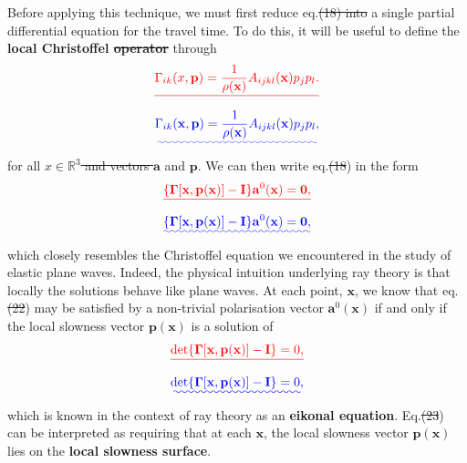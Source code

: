 \documentclass [a4paper,12pt]{paper}
\providecommand{\DIFadd}[1]{{\protect\color{blue}\uwave{#1}}} %
\providecommand{\DIFdel}[1]{{\protect\color{red}\sout{#1}}}                      %
\providecommand{\DIFaddbegin}{} %
\providecommand{\DIFaddend}{} %
\providecommand{\DIFdelbegin}{} %
\providecommand{\DIFdelend}{} %
\begin{document}
Before applying this technique, we must first reduce eq.\DIFdelbegin \DIFdel{(18) into }\DIFdelend \DIFaddbegin \DIFadd{~(\ref{eq:18}) to }\DIFaddend a single partial differential equation for the travel time. 
To do this, it will be useful to define the \textbf{local Christoffel \DIFdelbegin \DIFdel{operator}\DIFdelend \DIFaddbegin \DIFadd{matrix}\DIFaddend } through
\DIFdelbegin \begin{displaymath}
\DIFdel{\Gamma_{ik}(x,\mathbf{p})=\frac{1}{\rho(\mathbf{x})}A_{ijkl}(\mathbf{x})p_{j}p_{l}.
}\end{displaymath}%
\DIFdelend \DIFaddbegin \begin{equation}
\DIFadd{\Gamma_{ik}(\mathbf{x},\mathbf{p})=\frac{1}{\rho(\mathbf{x})}A_{ijkl}(\mathbf{x})p_{j}p_{l},
\label{eq:21}
}\end{equation}\DIFaddend 
for all \DIFdelbegin \DIFdel{$x\in\mathbb{R}^{3}$ and vectors $\mathbf{a}$ }\DIFdelend \DIFaddbegin \DIFadd{$\mathbf{x}\in\mathbb{R}^{3}$ }\DIFaddend and $\mathbf{p}$. We can then write eq.\DIFdelbegin \DIFdel{(18}\DIFdelend \DIFaddbegin \DIFadd{~(\ref{eq:18}}\DIFaddend ) in the form
\DIFdelbegin \begin{displaymath}
\DIFdel{\{\bm{\Gamma}[\mathbf{x},\mathbf{p}(\mathbf{x})]-\mathbf{I}\}\mathbf{a}^{0}(\mathbf{x})=\mathbf{0},
}\end{displaymath}%
\DIFdelend \DIFaddbegin \begin{equation}
\DIFadd{\{\bm{\Gamma}[\mathbf{x},\mathbf{p}(\mathbf{x})]-\mathbf{I}\}\mathbf{a}^{0}(\mathbf{x})=\mathbf{0},
\label{eq:22}
}\end{equation}\DIFaddend 
which closely resembles the Christoffel equation we encountered in the study of elastic plane waves. Indeed, 
the physical intuition underlying ray theory is that locally the solutions behave like plane waves.
 At each point, $\mathbf{x}$, we know that eq.\DIFdelbegin \DIFdel{(22}\DIFdelend \DIFaddbegin \DIFadd{~(\ref{eq:22}}\DIFaddend ) may be satisfied by a non-trivial polarisation vector 
 $\mathbf{a}^{0}(\mathbf{x})$ if and only if the local slowness vector $\mathbf{p}(\mathbf{x})$ is a solution of
\DIFdelbegin \begin{displaymath}
\DIFdel{\det\{\bm{\Gamma}[\mathbf{x},\mathbf{p}(\mathbf{x})]-\mathbf{I}\}=0,
}\end{displaymath}%
\DIFdelend \DIFaddbegin \begin{equation}
\DIFadd{\det\{\bm{\Gamma}[\mathbf{x},\mathbf{p}(\mathbf{x})]-\mathbf{I}\}=0,
\label{eq:23}
}\end{equation}\DIFaddend 
which is known in the context of ray theory as an \textbf{eikonal equation}. Eq.\DIFdelbegin \DIFdel{(23}\DIFdelend \DIFaddbegin \DIFadd{~(\ref{eq:23}}\DIFaddend ) can be interpreted as requiring
 that at each $\mathbf{x}$, the local slowness vector $\mathbf{p}(\mathbf{x})$ lies on the \textbf{local slowness surface}.
\end{document}
